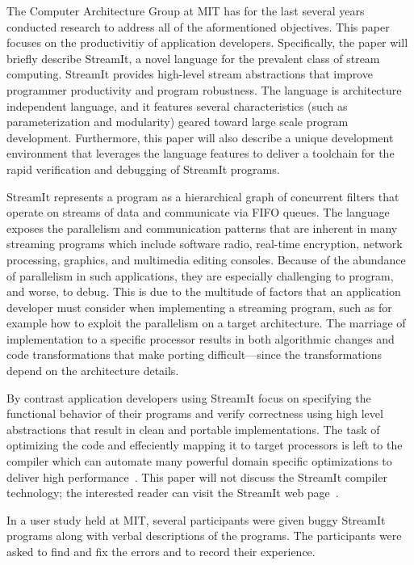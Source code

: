 \documentclass[11pt, letterpaper, onecolumn]{article}
\begin{document}
The Computer Architecture Group at  MIT has for the last several years
conducted  research to  address all  of the  aformentioned objectives.
This   paper    focuses   on   the    productivitiy   of   application
developers. Specifically, the paper  will briefly describe StreamIt, a
novel language  for the prevalent class of  stream computing. StreamIt
provides  high-level  stream   abstractions  that  improve  programmer
productivity  and  program robustness.  The  language is  architecture
independent language, and it features several characteristics (such as
parameterization  and modularity)  geared toward  large  scale program
development.  Furthermore,  this paper  will  also  describe a  unique
development  environment  that  leverages  the  language  features  to
deliver  a  toolchain for  the  rapid  verification  and debugging  of
StreamIt programs.

StreamIt represents  a program as  a hierarchical graph  of concurrent
filters  that operate  on streams  of  data and  communicate via  FIFO
queues.    The  language  exposes   the     parallelism  and
communication patterns  that are  inherent in many  streaming programs
which   include   software   radio,  real-time   encryption,   network
processing, graphics, and multimedia editing consoles.  Because of the
abundance  of parallelism  in such  applications, they  are especially
challenging  to program,  and worse,  to debug.   This is  due  to the
multitude of factors that  an application developer must consider when
implementing a streaming  program, such as for example  how to exploit
the   parallelism  on   a  target   architecture.   The   marriage  of
implementation  to a  specific processor  results in  both algorithmic
changes and  code transformations that  make porting difficult---since
the transformations depend on the architecture details.

By contrast application developers  using StreamIt focus on specifying
the functional behavior of their programs and verify correctness using
high   level  abstractions   that   result  in   clean  and   portable
implementations.   The task  of  optimizing the  code and  effeciently
mapping  it to target  processors is  left to  the compiler  which can
automate many  powerful domain specific optimizations  to deliver high
performance~\cite{streambit, linear, statespace}. This paper will not
discuss the StreamIt compiler technology; the interested reader can
visit the StreamIt web page~\cite{streamit-web}.

In a  user study  held at MIT,  several participants were  given buggy
StreamIt programs along with  verbal descriptions of the programs. The
participants were asked to find and fix the errors and to record their
experience. 
\end{document}
